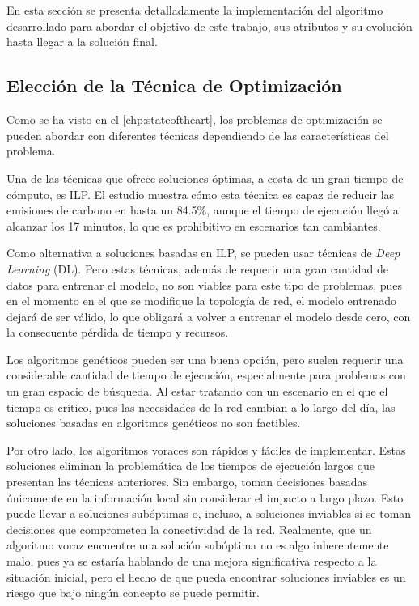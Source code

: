 \chapter{\implementationdevelopmentname}\label{chp:implementacion}

En esta sección se presenta detalladamente la implementación del algoritmo desarrollado para abordar el objetivo de este trabajo, sus atributos y su evolución hasta llegar a la solución final.

\section{Elección de la Técnica de Optimización}

Como se ha visto en el \autoref{chp:stateoftheart}, los problemas de optimización se pueden abordar con diferentes técnicas dependiendo de las características del problema.

Una de las técnicas que ofrece soluciones óptimas, a costa de un gran tiempo de cómputo, es ILP. El estudio \cite{GomezdelaHiz2025} muestra cómo esta técnica es capaz de reducir las emisiones de carbono en hasta un 84.5\%, aunque el tiempo de ejecución llegó a alcanzar los 17 minutos, lo que es prohibitivo en escenarios tan cambiantes. 

Como alternativa a soluciones basadas en ILP, se pueden usar técnicas de \textit{Deep Learning} (DL). Pero estas técnicas, además de requerir una gran cantidad de datos para entrenar el modelo, no son viables para este tipo de problemas, pues en el momento en el que se modifique la topología de red, el modelo entrenado dejará de ser válido, lo que obligará a volver a entrenar el modelo desde cero, con la consecuente pérdida de tiempo y recursos.

Los algoritmos genéticos pueden ser una buena opción, pero suelen requerir una considerable cantidad de tiempo de ejecución, especialmente para problemas con un gran espacio de búsqueda. Al estar tratando con un escenario en el que el tiempo es crítico, pues las necesidades de la red cambian a lo largo del día, las soluciones basadas en algoritmos genéticos no son factibles.

Por otro lado, los algoritmos voraces son rápidos y fáciles de implementar. Estas soluciones eliminan la problemática de los tiempos de ejecución largos que presentan las técnicas anteriores. Sin embargo, toman decisiones basadas únicamente en la información local sin considerar el impacto a largo plazo. Esto puede llevar a soluciones subóptimas o, incluso, a soluciones inviables si se toman decisiones que comprometen la conectividad de la red. Realmente, que un algoritmo voraz encuentre una solución subóptima no es algo inherentemente malo, pues ya se estaría hablando de una mejora significativa respecto a la situación inicial, pero el hecho de que pueda encontrar soluciones inviables es un riesgo que bajo ningún concepto se puede permitir.

